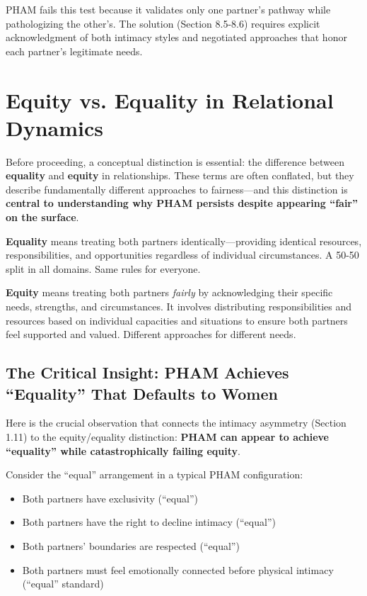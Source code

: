 \documentclass[12pt,openany]{book}
\numberwithin{equation}{chapter}
\begin{document}
PHAM fails this test because it validates only one partner's pathway while pathologizing the other's. The solution (Section 8.5-8.6) requires explicit acknowledgment of both intimacy styles and negotiated approaches that honor each partner's legitimate needs.

\section{Equity vs. Equality in Relational Dynamics}

Before proceeding, a conceptual distinction is essential: the difference between \textbf{equality} and \textbf{equity} in relationships. These terms are often conflated, but they describe fundamentally different approaches to fairness---and this distinction is \textbf{central to understanding why PHAM persists despite appearing ``fair'' on the surface}.

\textbf{Equality} means treating both partners identically---providing identical resources, responsibilities, and opportunities regardless of individual circumstances. A 50-50 split in all domains. Same rules for everyone.

\textbf{Equity} means treating both partners \textit{fairly} by acknowledging their specific needs, strengths, and circumstances. It involves distributing responsibilities and resources based on individual capacities and situations to ensure both partners feel supported and valued. Different approaches for different needs.

\subsection{The Critical Insight: PHAM Achieves ``Equality'' That Defaults to Women}

Here is the crucial observation that connects the intimacy asymmetry (Section 1.11) to the equity/equality distinction: \textbf{PHAM can appear to achieve ``equality'' while catastrophically failing equity}.

Consider the ``equal'' arrangement in a typical PHAM configuration:
\begin{itemize}
    \item Both partners have exclusivity (``equal'')
    \item Both partners have the right to decline intimacy (``equal'')
    \item Both partners' boundaries are respected (``equal'')
    \item Both partners must feel emotionally connected before physical intimacy (``equal'' standard)
\end{itemize}
\end{document}
